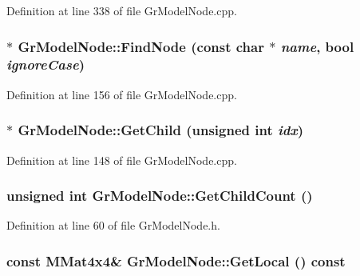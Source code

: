 Definition at line 338 of file GrModelNode.cpp.\hypertarget{class_gr_model_node_ea35f9469b11a8a8033f8ad1c7a54c24}{
\subsubsection[{FindNode}]{ $\ast$ GrModelNode::FindNode (const char $\ast$ {\em name}, \/  bool {\em ignoreCase})}}
\label{class_gr_model_node_ea35f9469b11a8a8033f8ad1c7a54c24}




Definition at line 156 of file GrModelNode.cpp.\hypertarget{class_gr_model_node_5b6cf7fff3778f0c4411823132cb5c28}{
\subsubsection[{GetChild}]{ $\ast$ GrModelNode::GetChild (unsigned int {\em idx})}}
\label{class_gr_model_node_5b6cf7fff3778f0c4411823132cb5c28}




Definition at line 148 of file GrModelNode.cpp.\hypertarget{class_gr_model_node_a21248145ac1e276678ee4e8e1b02b0c}{
\subsubsection[{GetChildCount}]{\setlength{\rightskip}{0pt plus 5cm}unsigned int GrModelNode::GetChildCount ()}}
\label{class_gr_model_node_a21248145ac1e276678ee4e8e1b02b0c}




Definition at line 60 of file GrModelNode.h.\hypertarget{class_gr_model_node_830a21b1037e3b0d6859626bc5bfcf74}{
\subsubsection[{GetLocal}]{\setlength{\rightskip}{0pt plus 5cm}const {\bf MMat4x4}\& GrModelNode::GetLocal () const}}
\label{class_gr_model_node_830a21b1037e3b0d6859626bc5bfcf74}




